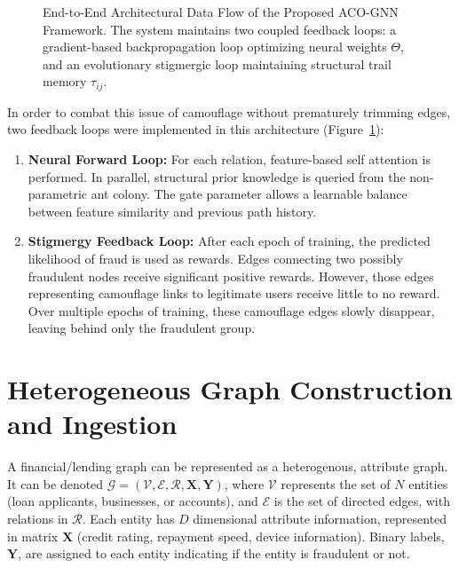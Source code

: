 \begin{figure}[!htbp]
{%
}
\caption[End-to-End Architectural Data Flow of ACO-GNN Framework]{End-to-End Architectural Data Flow of the Proposed ACO-GNN Framework. The system maintains two coupled feedback loops: a gradient-based backpropagation loop optimizing neural weights $\Theta$, and an evolutionary stigmergic loop maintaining structural trail memory $\tau_{ij}$.}
\label{fig:system_architecture}
\end{figure}

In order to combat this issue of camouflage without prematurely trimming edges, two feedback loops were implemented in this architecture (Figure~\ref{fig:system_architecture}):
\begin{enumerate}
    \item \textbf{Neural Forward Loop:} For each relation, feature-based self attention is performed. In parallel, structural prior knowledge is queried from the non-parametric ant colony. The gate parameter allows a learnable balance between feature similarity and previous path history.
    \item \textbf{Stigmergy Feedback Loop:} After each epoch of training, the predicted likelihood of fraud is used as rewards. Edges connecting two possibly fraudulent nodes receive significant positive rewards. However, those edges representing camouflage links to legitimate users receive little to no reward. Over multiple epochs of training, these camouflage edges slowly disappear, leaving behind only the fraudulent group.
\end{enumerate}

\section[Heterogeneous Graph Construction]{Heterogeneous Graph Construction and Ingestion}
\label{sec:relation_construction}
\label{sec:graph_formulation}

A financial/lending graph can be represented as a heterogenous, attribute graph. It can be denoted $\mathcal{G} = (\mathcal{V}, \mathcal{E}, \mathcal{R}, \mathbf{X}, \mathbf{Y})$, where $\mathcal{V}$ represents the set of $N$ entities (loan applicants, businesses, or accounts), and $\mathcal{E}$ is the set of directed edges, with relations in $\mathcal{R}$. Each entity has $D$ dimensional attribute information, represented in matrix $\mathbf{X}$ (credit rating, repayment speed, device information). Binary labels, $\mathbf{Y}$, are assigned to each entity indicating if the entity is fraudulent or not.

